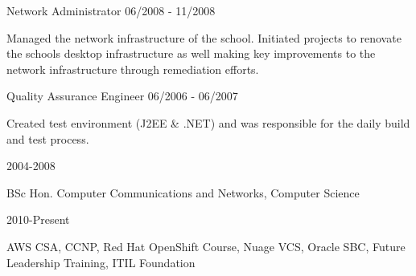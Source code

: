 \documentclass[11pt]{article} %
\begin{document}
\begin{description}
           {Network Administrator}
           {06/2008 - 11/2008}

Managed the network infrastructure of the school. Initiated projects to renovate the schools desktop infrastructure as well making key improvements to the network infrastructure through remediation efforts.

           {Quality Assurance Engineer}
           {06/2006 - 06/2007}

Created test environment (J2EE \& .NET) and was responsible for the daily build and test process.


\end{description}


\begin{description}
\squish
{}
           {}
           {2004-2008}

BSc Hon. Computer Communications and Networks, Computer Science

           {}
           {2010-Present}

AWS CSA, CCNP, Red Hat OpenShift Course, Nuage VCS, Oracle SBC, Future Leadership Training, ITIL Foundation


\end{description}

%
%
%
%
%
\end{document}
